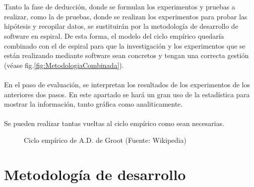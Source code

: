 \\ \\
Tanto la fase de deducción, donde se formulan los experimentos y pruebas a realizar, como la de pruebas, donde se realizan los experimentos para probar las hipótesis y recopilar datos, se sustituirán por la metodología de desarrollo de software en espiral. De esta forma, el modelo del ciclo empírico quedaría combinado con el de espiral para que la investigación y los experimentos que se están realizando mediante software sean concretos y tengan una correcta gestión (véase fig.\ref{fig:MetodologiaCombinada}). 
\\ \\
En el paso de evaluación, se interpretan los resultados de los experimentos de los anteriores dos pasos. En este apartado se hará un gran uso de  la estadística para mostrar la información, tanto gráfica como analiticamente.
\\ \\
Se pueden realizar tantas vueltas al ciclo empírico como sean necesarias.
\begin{figure}[thbp]
    \centering
    \caption{Ciclo empírico de A.D. de Groot (Fuente: Wikipedia\autocite{InvestigacionEmpirica2020})} 
    \label{fig:CicloEmpirico}
\end{figure}

\section{Metodología de desarrollo}

